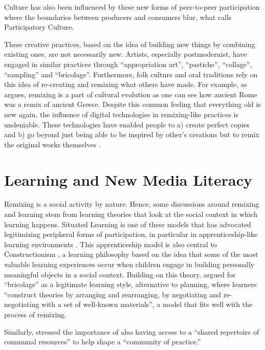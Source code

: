 Culture has also been influenced by these new forms of peer-to-peer participation where the boundaries between producers and consumers blur, what \citet{jenkins_convergence_2006} calls Participatory Culture.

These creative practices, based on the idea of building new things by combining existing ones, are not necessarily new. 
Artists, especially postmodernist, have engaged in similar practices through ``appropriation art'', ``pastiche'', ``collage'', ``sampling'' and ``bricolage''. 
Furthermore, folk culture and oral traditions rely on this idea of re-creating and remixing what others have made. %
For example, as \citet{manovich_remix_2005} argues, remixing is a part of cultural evolution as one can see how ancient Rome was a remix of ancient Greece.
Despite this common feeling that everything old is new again, the influence of digital technologies in remixing-like practices is undeniable. 
These technologies have enabled people to a) create perfect copies and b) go beyond just being able to be inspired by other's creations but to remix the original works themselves \citep{sinnreich_ethics_2009}.

\section{Learning and New Media Literacy}

Remixing is a social activity by nature. Hence, some discussions around remixing and learning stem from learning theories that look at the social context in which learning happens.
Situated Learning is one of these models that has advocated legitimizing peripheral forms of participation, in particular in apprenticeship-like learning environments \citep{lave_situated_1991}. 
This apprenticeship model is also central to Constructionism \citep{papert_mindstorms_1980}, a learning philosophy based on the idea that some of the most valuable learning experiences occur when children engage in building personally meaningful objects in a social context. 
Building on this theory, \citet{turkle_epistemological_1990} argued for ``bricolage'' as a legitimate learning style, alternative to planning, where learners ``construct theories by arranging and rearranging, by negotiating and re-negotiating with a set of well-known materials'', a model that fits well with the process of remixing.

Similarly, \citet{wenger_communities_1998} stressed the importance of also having access to a ``shared repertoire of communal resources'' to help shape a ``community of practice.''

